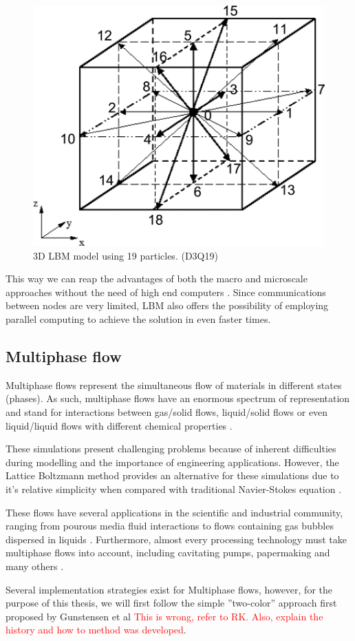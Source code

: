 \documentclass[12pt]{book}
\begin{document}
\begin{figure}[H]
\centering
  \includegraphics[width=0.3\linewidth]{Resources/Images/d3q19.png}
  \caption{3D LBM model using 19 particles. (D3Q19)}
  \label{fig:d3q19}
\end{figure}

\par
This way we can reap the advantages of both the macro and microscale approaches without the need of high end computers \cite{lbm_springer}. Since communications between nodes are very limited, LBM also offers the possibility of employing parallel computing to achieve the solution in even faster times.

\subsection{Multiphase flow}
Multiphase flows represent the simultaneous flow of materials in different states (phases). As such, multiphase flows have an enormous spectrum of representation and stand for interactions between gas/solid flows, liquid/solid flows or even liquid/liquid flows with different chemical properties \cite{multiphase}.\par
These simulations present challenging problems because of inherent difficulties during modelling and the importance of engineering applications. However, the Lattice Boltzmann method provides an alternative for these simulations due to it's relative simplicity when compared with traditional Navier-Stokes equation \cite{chenDoolenMP}.
\par These flows have several applications in the scientific and industrial community, ranging from pourous media fluid interactions \cite{pourous} to flows containing gas bubbles dispersed in liquids \cite{gasBubble}. Furthermore, almost every processing technology must take multiphase flows into account, including cavitating pumps, papermaking and many others \cite{multiphase}.
\par Several implementation strategies exist for Multiphase flows, however, for the purpose of this thesis, we will first follow the simple ''two-color'' approach first proposed by Gunstensen et al \cite{gunstensen} \textcolor{red}{This is wrong, refer to RK. Also, explain the history and how to method was developed}.
\end{document}
